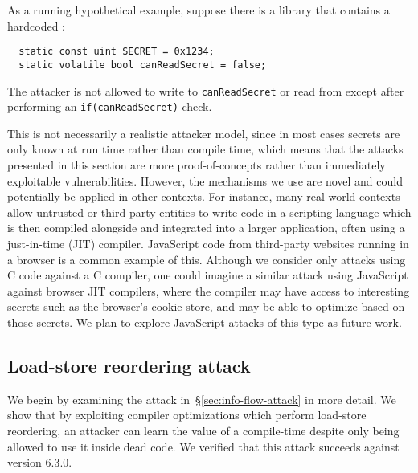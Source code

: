 \documentclass[conference]{IEEEtran}
\theoremstyle{plain}
\theoremstyle{definition}
\begin{document}
As a running hypothetical example, suppose there is a library that contains
a hardcoded {\SEC}: %
\begin{verbatim}
  static const uint SECRET = 0x1234;
  static volatile bool canReadSecret = false;
\end{verbatim}
The attacker is not allowed to write to \verb|canReadSecret| or read from {\SEC}
except after performing an \verb|if(canReadSecret)| check.

This is not necessarily a realistic attacker model,
since in most cases secrets are only known at run time rather than compile time,
which means that the attacks presented in this section
are more proof-of-concepts rather than immediately exploitable vulnerabilities.
However, the mechanisms we use are novel and could potentially be applied
in other contexts.
For instance, many real-world contexts allow untrusted or
third-party entities to write code in a scripting language which is then
compiled alongside and integrated into a larger application, often
using a just-in-time (JIT) compiler.
JavaScript code from third-party websites running in a browser is a common
example of this.
Although we consider only attacks using C code against a C compiler,
one could imagine a similar attack using JavaScript against browser JIT
compilers, where the compiler may have access to interesting secrets such as the
browser's cookie store, and may be able to optimize based on those secrets.
We plan to explore JavaScript attacks of this type as future work.

\subsection{Load-store reordering attack}
\label{subsec:exp-rel-mem}

We begin by examining the attack in~\S\ref{sec:info-flow-attack} in
more detail.
We show that by exploiting compiler optimizations which perform
load-store reordering, an attacker can learn the value of a compile-time
{\SEC} despite only being allowed to use it inside dead code.
We verified that this attack succeeds against {\GCC} version 6.3.0.
\end{document}
